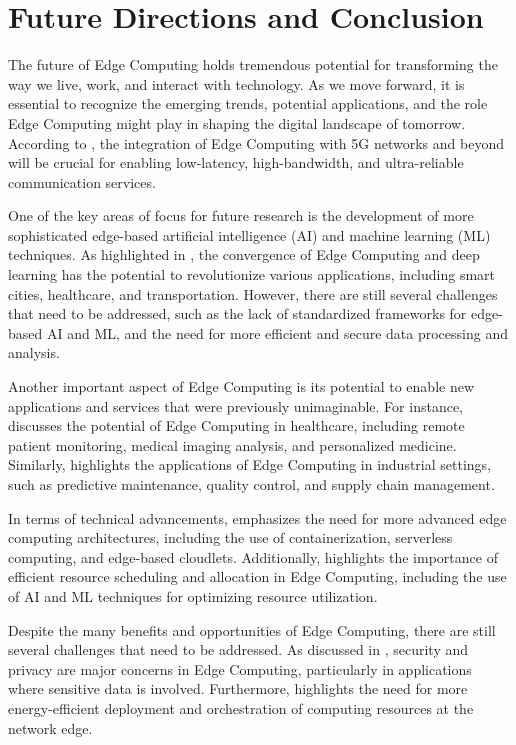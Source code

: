 \documentclass[11pt,a4paper]{article}
\begin{document}
\section{Future Directions and Conclusion}


The future of Edge Computing holds tremendous potential for transforming the way we live, work, and interact with technology. As we move forward, it is essential to recognize the emerging trends, potential applications, and the role Edge Computing might play in shaping the digital landscape of tomorrow. According to \cite{arxiv:1703.10750}, the integration of Edge Computing with 5G networks and beyond will be crucial for enabling low-latency, high-bandwidth, and ultra-reliable communication services. 

One of the key areas of focus for future research is the development of more sophisticated edge-based artificial intelligence (AI) and machine learning (ML) techniques. As highlighted in \cite{arxiv:1907.08349}, the convergence of Edge Computing and deep learning has the potential to revolutionize various applications, including smart cities, healthcare, and transportation. However, there are still several challenges that need to be addressed, such as the lack of standardized frameworks for edge-based AI and ML, and the need for more efficient and secure data processing and analysis.

Another important aspect of Edge Computing is its potential to enable new applications and services that were previously unimaginable. For instance, \cite{arxiv:2004.07311} discusses the potential of Edge Computing in healthcare, including remote patient monitoring, medical imaging analysis, and personalized medicine. Similarly, \cite{arxiv:1912.00595} highlights the applications of Edge Computing in industrial settings, such as predictive maintenance, quality control, and supply chain management.

In terms of technical advancements, \cite{arxiv:2109.12195} emphasizes the need for more advanced edge computing architectures, including the use of containerization, serverless computing, and edge-based cloudlets. Additionally, \cite{arxiv:2108.08059} highlights the importance of efficient resource scheduling and allocation in Edge Computing, including the use of AI and ML techniques for optimizing resource utilization.

Despite the many benefits and opportunities of Edge Computing, there are still several challenges that need to be addressed. As discussed in \cite{arxiv:2206.07164}, security and privacy are major concerns in Edge Computing, particularly in applications where sensitive data is involved. Furthermore, \cite{arxiv:2209.14141} highlights the need for more energy-efficient deployment and orchestration of computing resources at the network edge.
\end{document}
